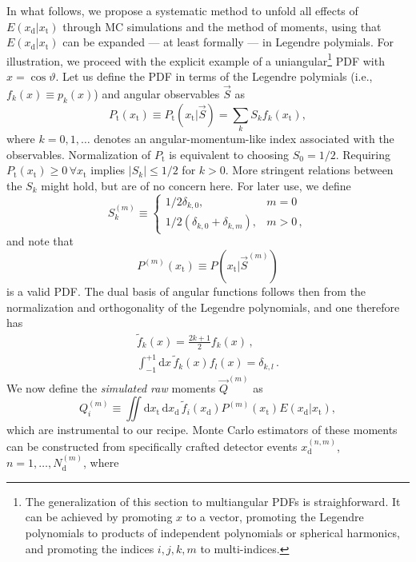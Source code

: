 \documentclass[aps,nofootinbib,preprintnumbers,prd,twocolumn]{revtex4-1}
\newcommand{\rmdx}[1]{\mbox{d} #1 \,} %
\newcommand{\subd}{_{\text{d}}}
\newcommand{\subt}{_{\text{t}}}
\renewcommand{\theta}{\vartheta}
\newcommand{\xd}{x\subd}
\newcommand{\xt}{x\subt}
\newcommand{\Ekernel}{E(\xd|\xt)}
\begin{document}
In what follows, we propose a systematic method to unfold all effects
of $\Ekernel$ through MC simulations and the method of moments,
using that $\Ekernel$ can be expanded --- at
least formally --- in Legendre polymials.  For illustration, we
proceed with the explicit example of a uniangular\footnote{%
  The generalization of this section to multiangular PDFs is
  straighforward. It can be achieved by promoting $x$ to a vector,
  promoting the Legendre polynomials to products of independent
  polynomials or spherical harmonics, and promoting the indices
  $i,j,k,m$ to multi-indices.  } PDF with $x = \cos\theta$. Let us
define the PDF in terms of the Legendre polymials (i.e., $f_k(x)
\equiv p_k(x)$) and angular observables $\vec{S}$ as
\begin{equation}
    P\subt(\xt) \equiv P\subt(\xt | \vec{S}) = \sum_k S_k f_k(\xt),
  \end{equation}
where $k = 0, 1, \dots$ denotes an angular-momentum-like index associated with the observables.
Normalization of $P\subt$ is equivalent to choosing $S_0 = 1/2$. Requiring $P\subt(\xt) \ge 0 \,\forall \xt$
implies $|S_k| \leq 1/2$ for $k > 0$. More stringent relations between the
$S_k$ might hold, but are of no concern here. For later use, we define
\begin{equation}
  \label{eq:def-Sk}
  S^{(m)}_k \equiv
  \begin{cases}
    1/2 \delta_{k,0}, & m=0\\
    1/2 (\delta_{k,0} + \delta_{k,m}), & m>0 \,,
  \end{cases}
\end{equation}
and note that
\begin{equation}
    P^{(m)}(\xt) \equiv P(\xt | \vec{S}^{(m)})
\end{equation}
is a valid PDF. The dual basis of angular functions follows then from the normalization
and orthogonality of the Legendre polynomials, and one therefore has
\begin{gather}
    \tilde{f}_k(x) = \frac{2 k + 1}{2} f_k(x)\,,\\
    \int_{-1}^{+1} \rmdx{x} \tilde{f}_k(x) f_l(x) = \delta_{k,l}\,.
\end{gather}
We now define the \emph{simulated raw} moments $\vec{Q}^{(m)}$ as
\begin{equation}
    \label{eq:analytic-raw-moments}
    Q_i^{(m)} \equiv \iint \rmdx{\xt} \rmdx{\xd} \tilde{f}_i(\xd) P^{(m)}(\xt) \Ekernel,
\end{equation}
which are instrumental to our recipe. Monte Carlo estimators of these moments can be constructed from specifically crafted detector events $x_\text{d}^{(n,m)}$, $n = 1, \dots, N_\text{d}^{(m)}$, where
\end{document}
